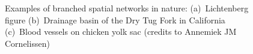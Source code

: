 \documentclass[]{pracamgr}
\begin{document}
\begin{figure}[H]
      \quad
      \caption{Examples of branched spatial networks in nature: (a)~Lichtenberg figure \cite{paulslab} (b)~Drainage basin of the Dry Tug Fork in California \cite{ball2009branches} (c)~Blood vessels on chicken yolk sac \cite{clement2017tissue} (credits to Annemiek JM Cornelissen)}
      \label{networks_in_nature}
    \end{figure}
\end{document}
